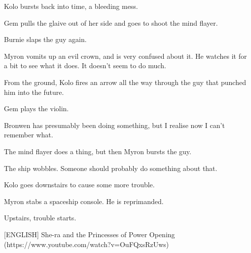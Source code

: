 Kolo bursts back into time, a bleeding mess.\medskip

Gem pulls the glaive out of her side and goes to shoot the mind flayer.\medskip

Burnie slaps the guy again.\medskip

Myron vomits up an evil crown, and is very confused about it. He watches it for a bit to see what it does. It doesn’t seem to do much.\medskip

From the ground, Kolo fires an arrow all the way through the guy that punched him into the future.\medskip

Gem plays the violin.\medskip

Bronwen has presumably been doing something, but I realise now I can’t remember what.\medskip

The mind flayer does a thing, but then Myron bursts the guy.\medskip

The ship wobbles. Someone should probably do something about that.\medskip

Kolo goes downstairs to cause some more trouble.\medskip

Myron stabs a spaceship console. He is reprimanded.\medskip

Upstairs, trouble starts.\medskip

[ENGLISH] She-ra and the Princesses of Power Opening (https://www.youtube.com/watch?v=OuFQxsRzUws)\medskip

\vspace*{5mm}
